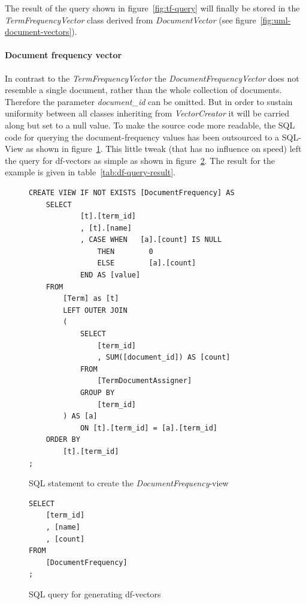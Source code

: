 \noindent
The result of the query shown in figure~\ref{fig:tf-query} will finally be stored in the \textit{TermFrequencyVector} class derived from \textit{DocumentVector} (see figure~\ref{fig:uml-document-vectors}).

\paragraph{Document frequency vector}
In contrast to the \textit{TermFrequencyVector} the \textit{DocumentFrequencyVector} does not resemble a single document, rather than the whole collection of documents.
Therefore the parameter \textit{document\_id} can be omitted.
But in order to sustain uniformity between all classes inheriting from \textit{VectorCreator} it will be carried along but set to a null value.
To make the source code more readable, the SQL code for querying the document-frequency values has been outsourced to a SQL-View as shown in figure~\ref{fig:df-view}.
This little tweak (that has no influence on speed) left the query for df-vectors as simple as shown in figure~\ref{fig:df-query}.
The result for the example is given in table~\ref{tab:df-query-result}.

\begin{figure}[h]
    \lstset{language=SQL}
    \begin{lstlisting}
CREATE VIEW IF NOT EXISTS [DocumentFrequency] AS
    SELECT
            [t].[term_id]
            , [t].[name]
            , CASE WHEN   [a].[count] IS NULL
                THEN        0
                ELSE        [a].[count]
            END AS [value]
    FROM
        [Term] as [t]
        LEFT OUTER JOIN
        (
            SELECT
                [term_id]
                , SUM([document_id]) AS [count]
            FROM
                [TermDocumentAssigner]
            GROUP BY
                [term_id]
        ) AS [a]
            ON [t].[term_id] = [a].[term_id]
    ORDER BY
        [t].[term_id]
;
    \end{lstlisting}
    \caption{SQL statement to create the \textit{DocumentFrequency}-view}
    \label{fig:df-view}
\end{figure}

\begin{figure}[h]
    \lstset{language=SQL}
    \begin{lstlisting}
SELECT
    [term_id]
    , [name]
    , [count]
FROM
    [DocumentFrequency]
;
    \end{lstlisting}
    \caption{SQL query for generating df-vectors}
    \label{fig:df-query}
\end{figure}

